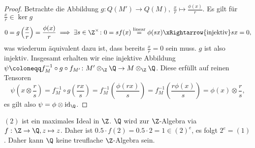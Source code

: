 \documentclass{article}
\begin{document}
\begin{enumerate}[(a)]
\begin{proof}
        Betrachte die Abbildung $g\colon Q(M') \to Q(M),\; \frac{x}{r} \mapsto \frac{\phi(x)}{r}$.
        Es gilt für $\frac{x}{r} \in \ker g$
        $$0 = g\left(\frac{x}{r}\right) =  \frac{\phi(x)}{r} \implies \exists s \in \Z^\times\colon 0 = sf(x) \overset{\text{linear}}{=} \phi(sx) \xRightarrow{\text{injektiv}} sx = 0,$$
        was wiederum äquivalent dazu ist, dass bereits $\frac{x}{r} = 0$ sein muss. $g$ ist also injektiv.
        Insgesamt erhalten wir eine injektive Abbildung $\psi \coloneqq f_M^{-1} \circ g \circ f_{M'} \colon M' \otimes_\Z \Q \to M \otimes_\Z \Q$.
        Diese erfüllt auf reinen Tensoren 
        $$\psi \left(x \otimes \frac{r}{s}\right) = f_M^{-1} \circ g \left( \frac{rx}{s} \right) = f_M^{-1}\left( \frac{\phi(rx)}{s}\right) = f_M^{-1}\left( \frac{r\phi(x)}{s}\right) = \phi(x) \otimes \frac{r}{s},$$
        es gilt also
        $\psi = \phi \otimes \operatorname{id}_\Q$.
    \end{proof}
    $(2)$ ist ein maximales Ideal in $\Z$. $\Q$ wird zur $\Z$-Algebra via $f: \Z \to \Q, z \mapsto z$. Daher ist $0.5 \cdot f(2) = 0.5 \cdot 2 = 1 \in (2)^e$,
    es folgt $2^e = (1)$. Daher kann $\Q$ keine treuflache $\Z$-Algebra sein.
\end{enumerate}
\end{document}

